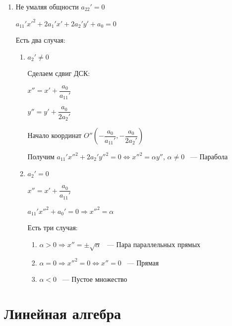 \documentclass[twoside]{book}
\begin{document}
\begin{enumerate}
\begin{enumerate}
              \item Не умаляя общности \(a_{22}' = 0\)

                    \(a_{11}' x'^2 + 2 a_1' x' + 2 a_2' y' + a_0 = 0\)

                    Есть два случая:
                    \begin{enumerate}
                        \item \(a_2' \neq 0\)

                              Сделаем сдвиг ДСК:

                              \(x'' = x' + \dfrac{a_0}{a_{11}'}\)

                              \(y'' = y' + \dfrac{a_0}{2 a_2'}\)

                              Начало координат \(O''\left(-\dfrac{a_0}{a_{11}'}, -\dfrac{a_0}{2 a_2'}\right)\)

                              Получим \(a_{11}' x''^2 + 2 a_2' y''^2 = 0 \Leftrightarrow x''^2 = \alpha y''\), \(\alpha \neq 0\) ~--- Парабола
                        \item \(a_2' = 0\)

                              \(x'' = x' + \dfrac{a_0}{a_{11}'}\)

                              \(a_{11}' x''^2 + a_0' = 0 \Rightarrow x''^2 = \alpha\)

                              Есть три случая:
                              \begin{enumerate}
                                  \item \(\alpha > 0 \Rightarrow x'' = \pm \sqrt \alpha\) ~--- Пара параллельных прямых

                                  \item \(\alpha = 0 \Rightarrow x''^2 = 0 \Leftrightarrow x'' = 0\) ~--- Прямая

                                  \item \(\alpha < 0\) ~--- Пустое множество
                              \end{enumerate}
                    \end{enumerate}
          \end{enumerate}
\end{enumerate}

\chapter{Линейная алгебра}
\end{document}
